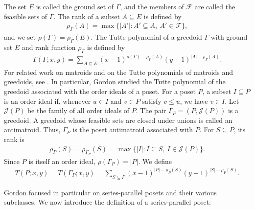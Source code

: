\documentclass[11pt,a4paper]{article}
\begin{document}
The set $E$ is called the ground set of $\Gamma$, and the members of
$\mathcal F$ are called the feasible sets of $\Gamma$.
The rank of a subset $A\subseteq E$ is defined by
\begin{eqnarray*}
\rho_{\Gamma}(A)=\max\{|A'|:A'\subseteq A,\ A'\in\mathcal F\},
\end{eqnarray*}
and we set $\rho(\Gamma)=\rho_{\Gamma}(E)$.
The Tutte polynomial of a greedoid $\Gamma$ with ground set $E$
and rank function $\rho_\Gamma$ is defined by
\begin{eqnarray*}
T(\Gamma;x,y)
= \sum_{A\subseteq E}
(x-1)^{\rho(\Gamma)-\rho_\Gamma(A)}
(y-1)^{|A|-\rho_\Gamma(A)}.
\end{eqnarray*}
For related work on matroids and on the Tutte polynomials of matroids and greedoids, see
\cite{Bjorner1985, GeelenZhou2006, GordonMcMahon2022, KnappNoble2025, LuoWuLai2026, McMahon1993, Zhou2004, Zhou2018}.
In particular, Gordon \cite{Gordon1993} studied the Tutte polynomial of the greedoid
associated with the order ideals of a poset.
For a poset $P$, a subset $I\subseteq P$ is an order ideal if,
whenever $u\in I$ and $v\in P$ satisfy $v\leq u$, we have $v\in I$.
Let $\mathcal J(P)$ be the family of all order ideals of $P$.
The pair $\Gamma_P=(P,\mathcal J(P))$ is a greedoid.
A greedoid whose feasible sets are closed under unions is
called an antimatroid. Thus, $\Gamma_P$ is the poset antimatroid associated with $P$. 
For $S\subseteq P$, its rank is
\begin{eqnarray*}
\rho_P(S)=\rho_{\Gamma_P}(S)=\max\{|I|:I\subseteq S,\ I\in\mathcal J(P)\}.
\end{eqnarray*}
Since $P$ is itself an order ideal, $\rho(\Gamma_P)=|P|$. We define
\begin{eqnarray*}
T(P;x,y)=T(\Gamma_P;x,y)=\sum_{S\subseteq P}(x-1)^{|P|-\rho_P(S)}(y-1)^{|S|-\rho_P(S)}.
\end{eqnarray*}

Gordon \cite{Gordon1993} focused in particular on series-parallel posets
and their various subclasses.
We now introduce the definition of a series-parallel poset:
\end{document}
